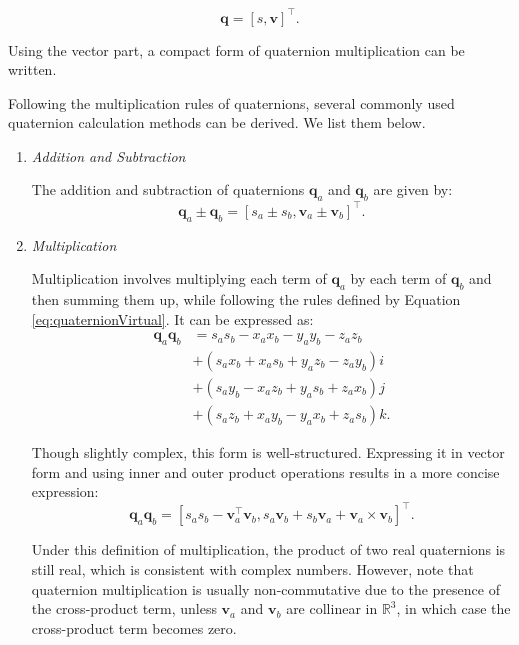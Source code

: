 \begin{equation}
	\mathbf{q} = [s, \mathbf{v}]^\top.
\end{equation}

Using the vector part, a compact form of quaternion multiplication can be written.

Following the multiplication rules of quaternions, several commonly used quaternion calculation methods can be derived. We list them below.
\begin{enumerate}
	\item \emph{Addition and Subtraction}
	
	The addition and subtraction of quaternions $\mathbf{q}_a$ and $\mathbf{q}_b$ are given by:
	\begin{equation} 	
		\mathbf{q}_a \pm \mathbf{q}_b = \left[ s_a \pm s_b, \mathbf{v}_a \pm \mathbf{v}_b \right]^\top.
	\end{equation}
	
	\item \emph{Multiplication}
	
	Multiplication involves multiplying each term of $\mathbf{q}_a$ by each term of $\mathbf{q}_b$ and then summing them up, while following the rules defined by Equation \eqref{eq:quaternionVirtual}. It can be expressed as:
	\begin{equation}
		\begin{aligned}
			\mathbf{q}_a \mathbf{q}_b &= {s_a}{s_b} - {x_a}{x_b} - {y_a}{y_b} - {z_a}{z_b}\\
			&+ \left( {{s_a}{x_b} + {x_a}{s_b} + {y_a}{z_b} - {z_a}{y_b}} \right)i\\
			&+ \left( {{s_a}{y_b} - {x_a}{z_b} + {y_a}{s_b} + {z_a}{x_b}} \right)j\\
			&+ \left( {{s_a}{z_b} + {x_a}{y_b} - {y_a}{x_b} + {z_a}{s_b}} \right)k.
		\end{aligned}
	\end{equation}
	
	Though slightly complex, this form is well-structured. Expressing it in vector form and using inner and outer product operations results in a more concise expression:
	\begin{equation}
		\mathbf{q}_a \mathbf{q}_b = \left[ s_a s_b - \mathbf{v}_a^\top \mathbf{v}_b, s_a\mathbf{v}_b + s_b\mathbf{v}_a 
		+ \mathbf{v}_a \times \mathbf{v}_b \right]^\top.
	\end{equation}
	
	Under this definition of multiplication, the product of two real quaternions is still real, which is consistent with complex numbers. However, note that quaternion multiplication is usually non-commutative due to the presence of the cross-product term, unless $\mathbf{v}_a$ and $\mathbf{v}_b$ are collinear in $\mathbb{R}^3$, in which case the cross-product term becomes zero.
	

\end{enumerate}

